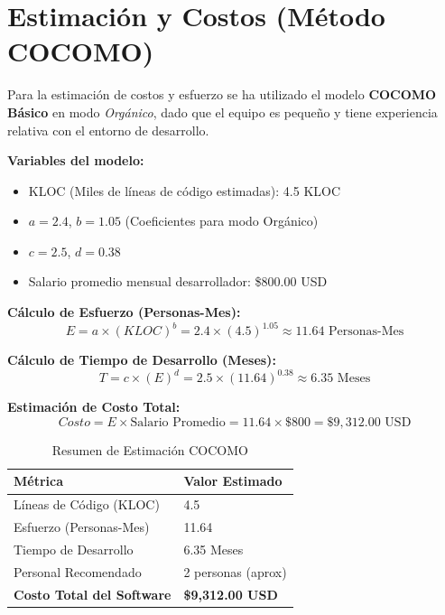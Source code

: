\documentclass[12pt, a4paper]{article}
\begin{document}
	\section{Estimación y Costos (Método COCOMO)}
	
	Para la estimación de costos y esfuerzo se ha utilizado el modelo \textbf{COCOMO Básico} en modo \textit{Orgánico}, dado que el equipo es pequeño y tiene experiencia relativa con el entorno de desarrollo.
	
	\textbf{Variables del modelo:}
	\begin{itemize}
		\item KLOC (Miles de líneas de código estimadas): 4.5 KLOC
		\item $a = 2.4$, $b = 1.05$ (Coeficientes para modo Orgánico)
		\item $c = 2.5$, $d = 0.38$
		\item Salario promedio mensual desarrollador: \$800.00 USD
	\end{itemize}
	
	\textbf{Cálculo de Esfuerzo (Personas-Mes):}
	\[ E = a \times (KLOC)^b = 2.4 \times (4.5)^{1.05} \approx 11.64 \text{ Personas-Mes} \]
	
	\textbf{Cálculo de Tiempo de Desarrollo (Meses):}
	\[ T = c \times (E)^d = 2.5 \times (11.64)^{0.38} \approx 6.35 \text{ Meses} \]
	
	\textbf{Estimación de Costo Total:}
	\[ Costo = E \times \text{Salario Promedio} = 11.64 \times \$800 = \$9,312.00 \text{ USD} \]
	
	\begin{table}[H]
		\centering
		\begin{tabular}{ll}
			\toprule
			\textbf{Métrica} & \textbf{Valor Estimado} \\
			\midrule
			Líneas de Código (KLOC) & 4.5 \\
			Esfuerzo (Personas-Mes) & 11.64 \\
			Tiempo de Desarrollo & 6.35 Meses \\
			Personal Recomendado & 2 personas (aprox) \\
			\textbf{Costo Total del Software} & \textbf{\$9,312.00 USD} \\
			\bottomrule
		\end{tabular}
		\caption{Resumen de Estimación COCOMO}
	\end{table}
	
\end{document}
